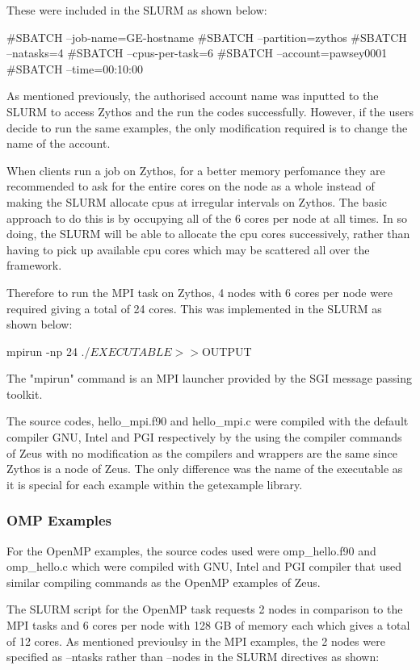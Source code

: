 \documentclass[journal]{IEEEtran}
\begin{document}
These were included in the SLURM as shown below:

#SBATCH --job-name=GE-hostname
#SBATCH --partition=zythos
#SBATCH --natasks=4
#SBATCH --cpus-per-task=6
#SBATCH --account=pawsey0001
#SBATCH --time=00:10:00

As mentioned previously, the authorised account name was inputted to the SLURM to access Zythos and the run the codes successfully. However, if the
users decide to run the same examples, the only modification required is to change the name of the account.

When clients run a job on Zythos, for a better memory perfomance they  are recommended to ask for the entire cores on the node as a whole instead of making the SLURM
allocate cpus at irregular intervals on Zythos. The basic approach to do this is by occupying all of the 6 cores per node at all times. In so doing, 
the SLURM will be able to allocate the cpu cores successively, rather than having to pick up available cpu cores which may be scattered all over the 
framework.

Therefore to run the MPI task on Zythos, 4 nodes with 6 cores per node were required giving a total of 24 cores. This was implemented in the SLURM as 
shown below:

mpirun -np 24 ./$EXECUTABLE >> ${OUTPUT}

The "mpirun" command is an MPI launcher provided by the SGI message passing toolkit.

The source codes, hello_mpi.f90 and hello_mpi.c were compiled with the default compiler GNU, Intel and PGI respectively by the using the compiler
commands of Zeus with no modification as the compilers and wrappers are the same since Zythos is a node of Zeus. The only difference was the name of the
executable as it is special for each example within the getexample library.

\subsubsection{OMP Examples}

For the OpenMP examples, the source codes used were omp_hello.f90 and omp_hello.c which were compiled with GNU, Intel and PGI compiler that used similar
compiling commands as the OpenMP examples of Zeus.

The SLURM script for the OpenMP task requests 2 nodes in comparison to the MPI tasks and 6 cores per node with 128 GB of memory each which gives a total 
of 12 cores. As mentioned previoulsy in the MPI examples, the 2 nodes were specified as --ntasks rather than --nodes in the SLURM directives as shown:
\end{document}

